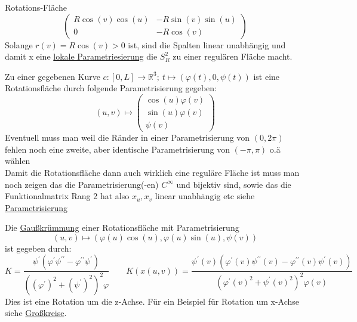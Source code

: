 \begin{titleDef}{Rotations-Fläche}
$$\begin{pmatrix}
	R\cos(v)\cos(u)&-R\sin(v)\sin(u)\\
	0&-R\cos(v)
\end{pmatrix}$$
Solange $r(v)=R\cos(v)>0$ ist, sind die Spalten linear unabhängig und damit x eine \hyperref[parametrisierung]{lokale Parametriesierung} die $S^2_R$ zu einer regulären Fläche macht.\par
Zu einer gegebenen Kurve $c:[0,L]\to\mathbb{R}^3;\: t\mapsto(\varphi(t),0,\psi(t))$ ist eine Rotationsfläche durch folgende Parametrisierung gegeben:
$$(u,v)\mapsto\begin{pmatrix}
	\cos(u)\varphi(v)\\\sin(u)\varphi(v)\\\psi(v)
\end{pmatrix}$$
Eventuell muss man weil die Ränder in einer Parametrisierung von $(0,2\pi)$ fehlen noch eine zweite, aber identische Parametrisierung von $(-\pi,\pi)$ o.ä wählen\\
Damit die Rotationsfläche dann auch wirklich eine reguläre Fläche ist muss man noch zeigen das die Parametrisierung(-en) $C^\infty$ und bijektiv sind, sowie das die Funktionalmatrix Rang 2 hat also $x_u,x_v$ linear unabhängig etc siehe \hyperref[parametrisierung]{Parametrisierung}\par
Die \hyperref[gausskruemmung]{Gaußkrümmung} einer Rotationsfläche mit Parametrisierung
$$(u,v)\mapsto(\varphi(u)\cos(u),\varphi(u)\sin(u),\psi(v))$$ ist gegeben durch:
$$K=\frac{\psi^\prime(\varphi^\prime\psi^{\prime\prime}-\varphi^{\prime\prime}\psi^\prime)}{((\varphi^\prime)^2+(\psi^\prime)^2)^2\varphi}\qquad K(x(u,v))=\frac{\psi^\prime(v)(\varphi^\prime(v)\psi^{\prime\prime}(v)-\varphi^{\prime\prime}(v)\psi^\prime(v))}{(\varphi^\prime(v)^2+\psi^\prime(v)^2)^2\varphi(v)}$$
Dies ist eine Rotation um die z-Achse. Für ein Beispiel für Rotation um x-Achse siehe \hyperref[grosskreis]{Großkreise}.
\end{titleDef}

